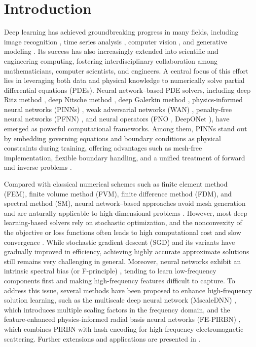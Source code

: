 \documentclass{article}
\begin{document}
\section{Introduction}
Deep learning has achieved groundbreaking progress in many fields, including image recognition \cite{ResNet}, time series analysis \cite{wang2025timemixer}, computer vision \cite{Huang2017}, and generative modeling \cite{diffusionmodels}. Its success has also increasingly extended into scientific and engineering computing, fostering interdisciplinary collaboration among mathematicians, computer scientists, and engineers. A central focus of this effort lies in leveraging both data and physical knowledge to numerically solve partial differential equations (PDEs). Neural network–based PDE solvers, including deep Ritz method \cite{deepRitz}, deep Nitsche method \cite{MR4247207}, deep Galerkin method \cite{DGM}, physics-informed neural networks (PINNs) \cite{PINNs}, weak adversarial networks (WAN) \cite{WAN}, penalty-free neural networks (PFNN) \cite{SHENG2021110085}, and neural operators (FNO \cite{Li2020FourierNO}, DeepONet \cite{DeepONet}), have emerged as powerful computational frameworks. Among them, PINNs stand out by embedding governing equations and boundary conditions as physical constraints during training, offering advantages such as mesh-free implementation, flexible boundary handling, and a unified treatment of forward and inverse problems \cite{MR4229292,MR4083367,MR3995303,  MR4513793,  MR4337814, MR4166066}.

Compared with classical numerical schemes such as finite element method (FEM), finite volume method (FVM), finite difference method (FDM), and spectral method (SM), neural network–based approaches avoid mesh generation and are naturally applicable to high-dimensional problems \cite{WAN}. However, most deep learning-based solvers rely on stochastic optimization, and the nonconvexity of the objective or loss functions often leads to high computational cost and slow convergence \cite{Markidis2021TheOA}. While stochastic gradient descent (SGD) and its variants have gradually improved in efficiency, achieving highly accurate approximate solutions still remains very challenging in general.
Moreover, neural networks exhibit an intrinsic spectral bias (or F-principle) \cite{Rahaman2018OnTS, FPrinciple}, tending to learn low-frequency components first and making high-frequency features difficult to capture. To address this issue, several methods have been proposed to enhance high-frequency solution learning, such as the multiscale deep neural network (MscaleDNN) \cite{MscaleDNN2020}, which introduces multiple scaling factors in the frequency domain, and the feature-enhanced physics-informed radial basis neural networks (FE-PIRBN) \cite{ZHANG2025113798}, which combines PIRBN with hash encoding for high-frequency electromagnetic scattering. Further extensions and applications are presented in \cite{Xian2024,XiAn2023, Yong2024, MR4636189}.
\end{document}

